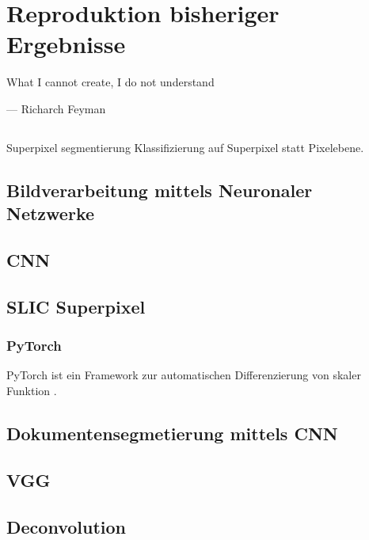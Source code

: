 \chapter{Reproduktion bisheriger Ergebnisse}
\label{chap:reproduktion}

\epigraph{What I cannot create, I do not understand}{--- Richarch Feyman}

\section{\textcite{ChenConvolutionalNeuralNetworks2017}}
Superpixel segmentierung
Klassifizierung auf Superpixel statt Pixelebene.

\section{Bildverarbeitung mittels Neuronaler Netzwerke}
\section{CNN}
\section{SLIC Superpixel}
\cite{AchantaSLICSuperpixels2010}


\subsection{PyTorch}
PyTorch ist ein Framework zur automatischen Differenzierung von skaler Funktion \autocite{PaszkeAutomaticdifferentiationPyTorch2017}.

\section{Dokumentensegmetierung mittels CNN}



\section{\textcite{XuPageSegmentationHistorical2017}}
\section{VGG}
\section{Deconvolution}
